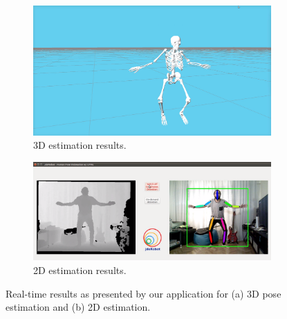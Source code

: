 \begin{figure}[h]\centering
    \begin{subfigure}{\textwidth}\centering
        \includegraphics[width=\textwidth]{figures/gui_3d.png} 
        \caption{3D estimation results.}
        \label{subfig:gui_3d}
    \end{subfigure}
    \begin{subfigure}{\textwidth}\centering
        \includegraphics[width=\textwidth]{figures/gui_2d.png}
        \caption{2D estimation results.}
        \label{subfig:gui_2d}
    \end{subfigure}
    \caption{Real-time results as presented by our application for (a) 3D pose estimation and (b) 2D estimation.}
    \label{fig:demo_result}
\end{figure}

